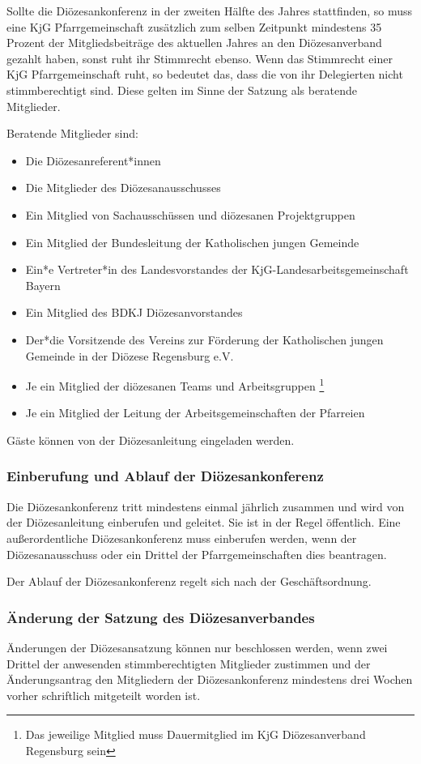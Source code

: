 \documentclass[12pt]{report}
\newcommand{\footnoteremember}[2]{%
  \footnote{#2}
  \newcounter{#1}
  \setcounter{#1}{\value{footnote}}
}
\newcommand{\footnoterecall}[1]{%
  \footnotemark[\value{#1}]
}
\begin{document}
\begin{justify}
Sollte die Diözesankonferenz in der zweiten Hälfte des Jahres stattfinden, so muss eine KjG Pfarrgemeinschaft zusätzlich zum selben Zeitpunkt mindestens 35 Prozent der Mitgliedsbeiträge des aktuellen Jahres an den Diözesanverband gezahlt haben, sonst ruht ihr Stimmrecht ebenso.
Wenn das Stimmrecht einer KjG Pfarrgemeinschaft ruht, so bedeutet das, dass die von ihr Delegierten nicht stimmberechtigt sind. Diese gelten im Sinne der Satzung als beratende Mitglieder.

Beratende Mitglieder sind:
\begin{itemize}
  \item Die Diözesanreferent*innen
  \item Die Mitglieder des Diözesanausschusses
  \item Ein Mitglied von Sachausschüssen und diözesanen Projektgruppen
  \item Ein Mitglied der Bundesleitung der Katholischen jungen Gemeinde
  \item Ein*e Vertreter*in des Landesvorstandes der KjG-Landesarbeitsgemeinschaft Bayern
  \item Ein Mitglied des BDKJ Diözesanvorstandes
  \item Der*die Vorsitzende des Vereins zur Förderung der Katholischen jungen Gemeinde in der
        Diözese Regensburg e.V.
  \item Je ein Mitglied der diözesanen Teams und
        Arbeitsgruppen\footnoteremember{Dauermitglied}{Das jeweilige Mitglied muss
        Dauermitglied im KjG Diözesanverband Regensburg sein}
  \item Je ein Mitglied der Leitung der Arbeitsgemeinschaften der
        Pfarreien\footnoterecall{Dauermitglied}
\end{itemize}

Gäste können von der Diözesanleitung eingeladen werden.
\subsubsection{Einberufung und Ablauf der Diözesankonferenz}
Die Diözesankonferenz tritt mindestens einmal jährlich zusammen und wird von der Diözesanleitung
einberufen und geleitet. Sie ist in der Regel öffentlich.
Eine außerordentliche Diözesankonferenz muss einberufen werden, wenn der Diözesanausschuss oder ein
Drittel der Pfarrgemeinschaften dies beantragen.

Der Ablauf der Diözesankonferenz regelt sich nach der Geschäftsordnung.

\subsubsection{Änderung der Satzung des Diözesanverbandes}
Änderungen der Diözesansatzung können nur beschlossen werden, wenn zwei Drittel der anwesenden
stimmberechtigten Mitglieder zustimmen und der Änderungsantrag den Mitgliedern der
Diözesankonferenz mindestens drei Wochen vorher schriftlich mitgeteilt worden ist.


\end{justify}
\end{document}

